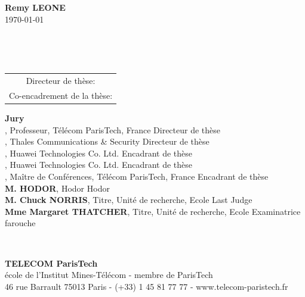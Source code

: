 \begin{center}
{\Large \textbf{Remy LEONE}}\\
\vspace{0.24cm}
{\normalsize \today}\\

\vfill

\textcolor[RGB]{191,18,56}{
\noindent
{\LARGE \textbf{\myTitle}}\\
}

\vfill~\vfill

{\normalsize
\begin{tabular}{c}
Directeur de thèse: 			\textbf{\JeanLouis}\\
Co-encadrement de la thèse:		\textbf{\Vania}
\end{tabular}
}
\end{center}

\vfill

\flushleft
\begin{minipage}{.9\textwidth}	%
  \textbf{Jury}\\

\textbf{\JeanLouis}, {\small Professeur, Télécom ParisTech, France}
	\hfill Directeur de thèse\\
\textbf{\Vania}, {\small Thales Communications \& Security}
	\hfill Directeur de thèse\\
\textbf{\Paolo}, {\small Huawei Technologies Co. Ltd.}
	\hfill Encadrant de thèse\\
\textbf{\Jeremie}, {\small Huawei Technologies Co. Ltd.}
	\hfill Encadrant de thèse\\
\textbf{\Claude}, {\small Maître de Conférences, Télécom ParisTech, France}
	\hfill Encadrant de thèse\\
\textbf{M. HODOR}, {\small Hodor}
	\hfill Hodor\\
\textbf{M. Chuck NORRIS}, {\small Titre, Unité de recherche, Ecole}
	\hfill Last Judge\\
\textbf{Mme Margaret THATCHER}, {\small Titre, Unité de recherche, Ecole}
	\hfill Examinatrice farouche\\

\end{minipage}\\

\vspace{-.3cm}

\centering
\textbf{TELECOM ParisTech}\\
{\small école de l'Institut Mines-Télécom - membre de ParisTech}\\
{\tiny 46 rue Barrault 75013 Paris - (+33) 1 45 81 77 77 - www.telecom-paristech.fr}

\restoregeometry
